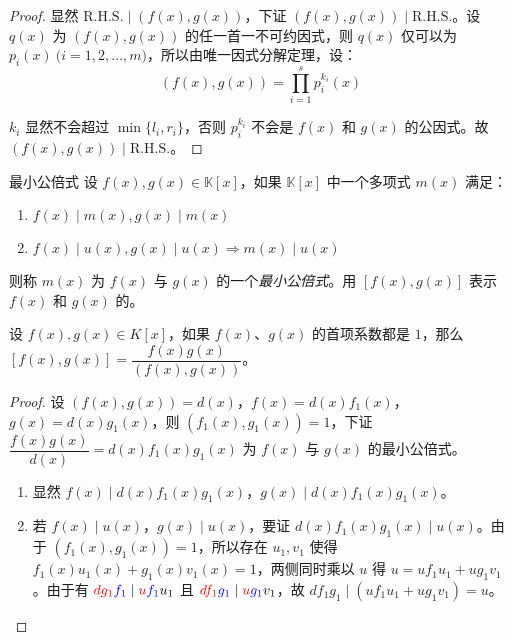\begin{proof}
	显然 $\mathrm{R.H.S.} \mid (f(x), g(x))$，下证 $(f(x), g(x)) \mid \mathrm{R.H.S.}$。设 $q(x)$ 为 $(f(x), g(x))$ 的任一首一不可约因式，则 $q(x)$ 仅可以为 $p_i(x) \pod{i = 1, 2, \ldots, m}$，所以由唯一因式分解定理，设：
	$$
	(f(x), g(x)) = \prod\limits_{i = 1}^s p_i^{k_i}(x)
	$$

	$k_i$ 显然不会超过 $\min\{ l_i, r_i \}$，否则 $p_i^{k_i}$ 不会是 $f(x)$ 和 $g(x)$ 的公因式。故 $(f(x), g(x)) \mid \mathrm{R.H.S.}$。
\end{proof}

\begin{definition}{最小公倍式}
	设 $f(x), g(x) \in \mathbb K[x]$，如果 $\mathbb K[x]$ 中一个多项式 $m(x)$ 满足：

	\begin{enumerate}
		\item $f(x) \mid m(x), g(x) \mid m(x)$
		\item $f(x) \mid u(x), g(x) \mid u(x) \Longrightarrow m(x) \mid u(x)$
	\end{enumerate}

	则称 $m(x)$ 为 $f(x)$ 与 $g(x)$ 的一个\emph{最小公倍式}。用 $[f(x), g(x)]$ 表示 $f(x)$ 和 $g(x)$ 的\emph{}。
\end{definition}

\begin{proposition}
	设 $f(x), g(x) \in K[x]$，如果 $f(x)$、$g(x)$ 的首项系数都是 $1$，那么 $[f(x), g(x)] = \dfrac{f(x) g(x)}{(f(x), g(x))}$。
\end{proposition}

\begin{proof}
	设 $(f(x), g(x)) = d(x)$，$f(x) = d(x) f_1(x)$，$g(x) = d(x) g_1(x)$，则 $(f_1(x), g_1(x)) = 1$，下证 $\dfrac{f(x) g(x)}{d(x)} = d(x) f_1(x) g_1(x)$ 为 $f(x)$ 与 $g(x)$ 的最小公倍式。

	\begin{enumerate}
		\item 显然 $f(x) \mid d(x) f_1(x) g_1(x)$，$g(x) \mid d(x) f_1(x) g_1(x)$。
		\item 若 $f(x) \mid u(x)$，$g(x) \mid u(x)$，要证 $d(x) f_1(x) g_1(x) \mid u(x)$。由于 $(f_1(x), g_1(x)) = 1$，所以存在 $u_1, v_1$ 使得 $f_1(x) u_1(x) + g_1(x) v_1(x) = 1$，两侧同时乘以 $u$ 得 $u = u f_1 u_1 + u g_1 v_1$。由于有 $\textcolor{red}{d g_1} \textcolor{blue}{f_1} \mid \textcolor{red}{u} \textcolor{blue}{f_1} u_1$ 且 $\textcolor{red}{d f_1} \textcolor{blue}{g_1} \mid \textcolor{red}{u} \textcolor{blue}{g_1} v_1$，故 $d f_1 g_1 \mid (u f_1 u_1 + u g_1 v_1) = u$。
	\end{enumerate}
\end{proof}

